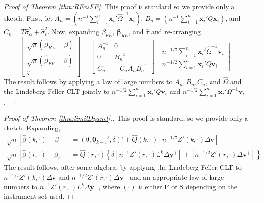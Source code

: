 \begin{proof}[Proof of Theorem \ref{thm:REvsFE}]
  This proof is standard so we provide only a sketch.
  First, let 
  $A_n = (n^{-1}\sum_{i=1}^n \mathbf{x}_i' \widehat{\Omega}^{-1}\mathbf{x}_i)$, $B_n = (n^{-1} \sum_{i=1}^n \mathbf{x}_i' Q\mathbf{x}_i)$, and $C_n = T\widehat{\sigma}_\alpha^2 + \widehat{\sigma}_\varepsilon^2$.
  Now, expanding $\widehat{\beta}_{FE}$, $\mathbf{\beta}_{RE}$, and $\widehat{\tau}$ and re-arranging
\[
  \left[
  \begin{array}{c}
\sqrt{n} (\widehat{\beta}_{RE} - \beta)\\
\sqrt{n} (\widehat{\beta}_{FE} - \beta)\\
\widehat{\tau}
  \end{array}
\right] = 
\left[
\begin{array}{cc}
  A_n^{-1} & 0 \\
  0 & B_n^{-1} \\
  C_n & -C_nA_nB_n^{-1}
\end{array}
\right] \left[
\begin{array}{c}
  n^{-1/2} \sum_{i=1}^n \mathbf{x}_i' \widehat{\Omega}^{-1} \mathbf{v}_i\\ 
  n^{-1/2} \sum_{i=1}^n \mathbf{x}_i' Q\mathbf{v}_i
\end{array}
\right].
\]
The result follows by applying a law of large numbers to $A_n, B_n, C_n$, and $\widehat{\Omega}$ and the Lindeberg-Feller CLT jointly to $n^{-1/2} \sum_{i=1}^n \mathbf{x}_i'Q\mathbf{v}_i$ and $n^{-1/2}\sum_{i=1}^n \mathbf{x}_i' \Omega^{-1} \mathbf{v}_i$. 
\end{proof}

\begin{proof}[Proof of Theorem \ref{thm:limitDpanel}.]
  This proof is standard, so we provide only a sketch.
Expanding, 
\begin{align*}
  \sqrt{n}\left[\widehat{\beta}(k,\cdot) - \beta\right] &=(0, \mathbf{0}_{k-1}', \delta)' + \widehat{Q}(k,\cdot)\left[ n^{-1/2}Z'(k,\cdot)\Delta \mathbf{v}\right]\\
  \sqrt{n}\left[\widehat{\beta}(r,\cdot) - \beta_{r}\right] &=  \widehat{Q}(r,\cdot)\left\{ \delta \left[n^{-1}Z'(r,\cdot) L^{k}\Delta \mathbf{y}^+\right] + \left[n^{-1/2}Z'(r,\cdot)\Delta \mathbf{v}^{+}\right] \right\}
\end{align*}
The result follows, after some algebra, by applying the Lindeberg-Feller CLT to $n^{-1/2}Z'(k,\cdot)\Delta \mathbf{v}$ and $n^{-1/2}Z'(r,\cdot)\Delta \mathbf{v}^{+}$ and an appropriate law of large numbers to $n^{-1} Z'(r,\cdot)L^k \Delta \mathbf{y}^{+}$, where $(\cdot)$ is either $\text{P}$ or $\text{S}$ depending on the instrument set used.
\end{proof}


